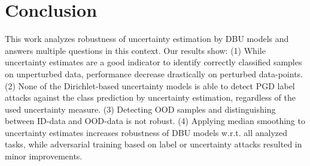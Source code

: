 \section{Conclusion}
\label{sec:conclusion_008}

This work analyzes robustness of uncertainty estimation by DBU models and answers multiple questions in this context. Our results show: (1) While uncertainty estimates are a good indicator to identify correctly classified samples on unperturbed data, performance decrease drastically on perturbed data-points. (2) None of the Dirichlet-based uncertainty models is able to detect PGD label attacks against the class prediction by uncertainty estimation, regardless of the used uncertainty measure. (3) Detecting OOD samples and distinguishing between ID-data and OOD-data is not robust. (4) Applying median smoothing to  uncertainty estimates increases robustness of DBU models w.r.t. all analyzed tasks, while adversarial training based on label or uncertainty attacks resulted in minor improvements. 



